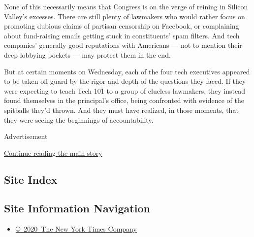 None of this necessarily means that Congress is on the verge of reining
in Silicon Valley's excesses. There are still plenty of lawmakers who
would rather focus on promoting dubious claims of partisan censorship on
Facebook, or complaining about fund-raising emails getting stuck in
constituents' spam filters. And tech companies' generally good
reputations with Americans --- not to mention their deep lobbying
pockets --- may protect them in the end.

But at certain moments on Wednesday, each of the four tech executives
appeared to be taken off guard by the rigor and depth of the questions
they faced. If they were expecting to teach Tech 101 to a group of
clueless lawmakers, they instead found themselves in the principal's
office, being confronted with evidence of the spitballs they'd thrown.
And they must have realized, in those moments, that they were seeing the
beginnings of accountability.

Advertisement

\protect\hyperlink{after-bottom}{Continue reading the main story}

\hypertarget{site-index}{%
\subsection{Site Index}\label{site-index}}

\hypertarget{site-information-navigation}{%
\subsection{Site Information
Navigation}\label{site-information-navigation}}

\begin{itemize}
\tightlist
\item
  \href{https://help.nytimes.com/hc/en-us/articles/115014792127-Copyright-notice}{©~2020~The
  New York Times Company}
\end{itemize}

